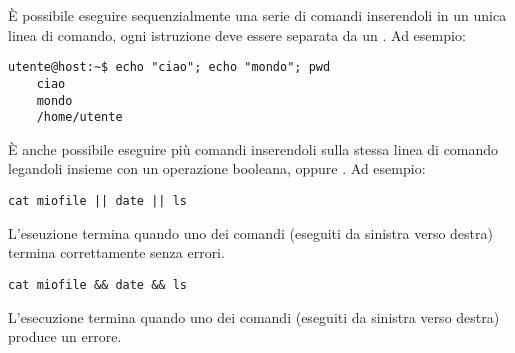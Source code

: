 \documentclass[../main.tex]{subfiles}
\begin{document}
È possibile eseguire sequenzialmente una serie di comandi inserendoli in un unica linea di comando, ogni istruzione deve essere
separata da un \code{;}. Ad esempio:
\begin{lstlisting}[style=bash]
    utente@host:~$ echo "ciao"; echo "mondo"; pwd
    ciao
    mondo
    /home/utente
\end{lstlisting}

È anche possibile eseguire più comandi inserendoli sulla stessa linea di comando legandoli insieme con un operazione booleana, 
oppure . Ad esempio:
\begin{lstlisting}[style=bash]
    cat miofile || date || ls
\end{lstlisting}
L'eseuzione termina quando uno dei comandi (eseguiti da sinistra verso destra) termina correttamente senza errori.

\begin{lstlisting}[style=bash]
    cat miofile && date && ls
\end{lstlisting}
L'esecuzione termina quando uno dei comandi (eseguiti da sinistra verso destra) produce un errore.
\end{document}
